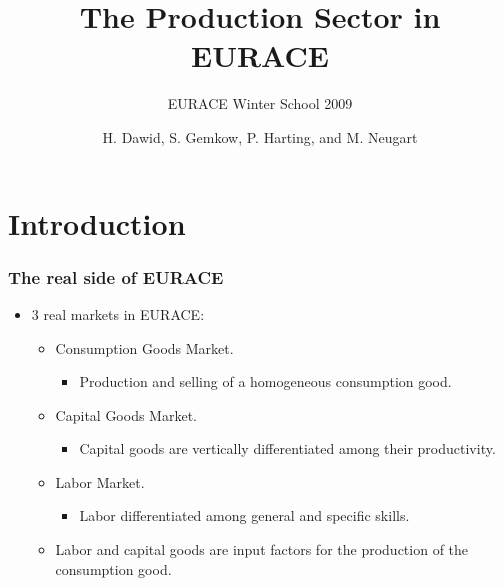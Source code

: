 \documentclass{beamer}
\title{The Production Sector in EURACE}
\subtitle{EURACE Winter School 2009}
\author{H. Dawid, S. Gemkow, P.
Harting, and M. Neugart}
\begin{document}
\frame{\titlepage}

\section[Overview]{}
\frame{\tableofcontents}

\section{Introduction}





\frame
{
  \frametitle{The real side of EURACE} 

\begin{itemize}

\item 3 real markets in EURACE:
		
		\begin{itemize}
				\item Consumption Goods Market.
				\begin{itemize}
					\item Production and selling of a homogeneous consumption good.
		
		\end{itemize}
		
		\item Capital Goods Market.
		
	\begin{itemize}
		\item Capital goods are vertically differentiated among their productivity. 
	
	 

	\end{itemize}
		\item Labor Market.
		\begin{itemize}
	\item  Labor differentiated among general and specific skills.

\end{itemize}

	\item Labor and capital goods are input factors for the production of the consumption good.

		\end{itemize}
\end{itemize}	

}
\end{document}
